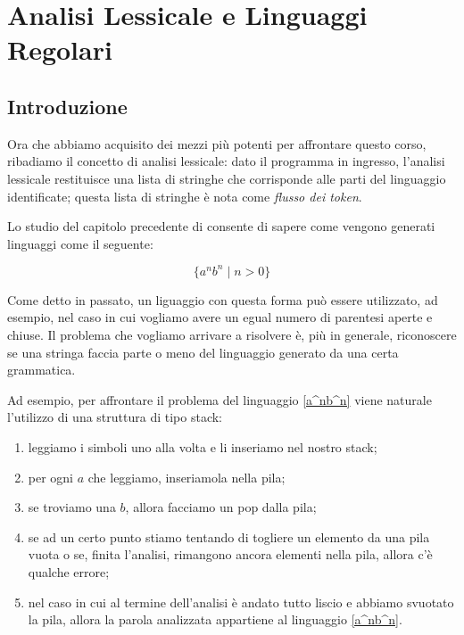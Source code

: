\documentclass[class=book, crop=false, oneside, 12pt]{standalone}
\begin{document}
\chapter{Analisi Lessicale e Linguaggi Regolari}

\section{Introduzione}

Ora che abbiamo acquisito dei mezzi più potenti per affrontare questo corso, ribadiamo il concetto di analisi lessicale: dato il programma in ingresso, l'analisi lessicale restituisce una lista di stringhe che corrisponde alle parti del linguaggio identificate; questa lista di stringhe è nota come \emph{flusso dei token}.

Lo studio del capitolo precedente di consente di sapere come vengono generati linguaggi come il seguente:

\begin{equation}
    \label{a^nb^n}
    \{ a^n b^n \mid n > 0 \}    
\end{equation}

Come detto in passato, un liguaggio con questa forma può essere utilizzato, ad esempio, nel caso in cui vogliamo avere un egual numero di parentesi aperte e chiuse.
Il problema che vogliamo arrivare a risolvere è, più in generale, riconoscere se una stringa faccia parte o meno del linguaggio generato da una certa grammatica.

Ad esempio, per affrontare il problema del linguaggio \ref{a^nb^n} viene naturale l'utilizzo di una struttura di tipo stack:

\begin{enumerate}
    \item leggiamo i simboli uno alla volta e li inseriamo nel nostro stack;
    \item per ogni \(a\) che leggiamo, inseriamola nella pila;
    \item se troviamo una \(b\), allora facciamo un pop dalla pila;
    \item se ad un certo punto stiamo tentando di togliere un elemento da una pila vuota o se, finita l’analisi, rimangono ancora elementi nella pila, allora c’è qualche errore;
    \item nel caso in cui al termine dell’analisi è andato tutto liscio e abbiamo svuotato la pila, allora la parola analizzata appartiene al linguaggio \ref{a^nb^n}.
\end{enumerate} 
\end{document}
